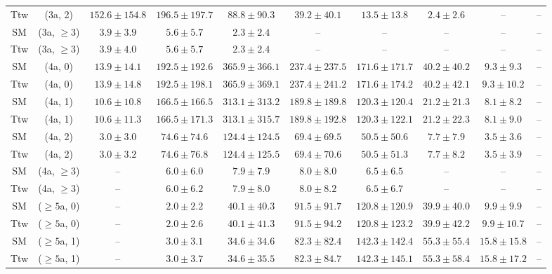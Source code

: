 \begin{table}[h!]
{\begin{tabular}{cccccccccc}
	Ttw & (3a, 2) & $152.6\pm 154.8$ & $196.5\pm 197.7$ & $88.8\pm 90.3$ & $39.2\pm 40.1$ & $13.5\pm 13.8$ & $2.4\pm 2.6$ & -- & -- \\[0.5ex] 
	SM & (3a, $\ge3$) & $3.9\pm 3.9$ & $5.6\pm 5.7$ & $2.3\pm 2.4$ & -- & -- & -- & -- & -- \\[0.5ex] 
	Ttw & (3a, $\ge3$) & $3.9\pm 4.0$ & $5.6\pm 5.7$ & $2.3\pm 2.4$ & -- & -- & -- & -- & -- \\[0.5ex] 
	SM & (4a, 0) & $13.9\pm 14.1$ & $192.5\pm 192.6$ & $365.9\pm 366.1$ & $237.4\pm 237.5$ & $171.6\pm 171.7$ & $40.2\pm 40.2$ & $9.3\pm 9.3$ & -- \\[0.5ex] 
	Ttw & (4a, 0) & $13.9\pm 14.8$ & $192.5\pm 198.1$ & $365.9\pm 369.1$ & $237.4\pm 241.2$ & $171.6\pm 174.2$ & $40.2\pm 42.1$ & $9.3\pm 10.2$ & -- \\[0.5ex] 
	SM & (4a, 1) & $10.6\pm 10.8$ & $166.5\pm 166.5$ & $313.1\pm 313.2$ & $189.8\pm 189.8$ & $120.3\pm 120.4$ & $21.2\pm 21.3$ & $8.1\pm 8.2$ & -- \\[0.5ex] 
	Ttw & (4a, 1) & $10.6\pm 11.3$ & $166.5\pm 171.3$ & $313.1\pm 315.7$ & $189.8\pm 192.8$ & $120.3\pm 122.1$ & $21.2\pm 22.3$ & $8.1\pm 9.0$ & -- \\[0.5ex] 
	SM & (4a, 2) & $3.0\pm 3.0$ & $74.6\pm 74.6$ & $124.4\pm 124.5$ & $69.4\pm 69.5$ & $50.5\pm 50.6$ & $7.7\pm 7.9$ & $3.5\pm 3.6$ & -- \\[0.5ex] 
	Ttw & (4a, 2) & $3.0\pm 3.2$ & $74.6\pm 76.8$ & $124.4\pm 125.5$ & $69.4\pm 70.6$ & $50.5\pm 51.3$ & $7.7\pm 8.2$ & $3.5\pm 3.9$ & -- \\[0.5ex] 
	SM & (4a, $\ge3$) & -- & $6.0\pm 6.0$ & $7.9\pm 7.9$ & $8.0\pm 8.0$ & $6.5\pm 6.5$ & -- & -- & -- \\[0.5ex] 
	Ttw & (4a, $\ge3$) & -- & $6.0\pm 6.2$ & $7.9\pm 8.0$ & $8.0\pm 8.2$ & $6.5\pm 6.7$ & -- & -- & -- \\[0.5ex] 
	SM & ($\ge5$a, 0) & -- & $2.0\pm 2.2$ & $40.1\pm 40.3$ & $91.5\pm 91.7$ & $120.8\pm 120.9$ & $39.9\pm 40.0$ & $9.9\pm 9.9$ & -- \\[0.5ex] 
	Ttw & ($\ge5$a, 0) & -- & $2.0\pm 2.6$ & $40.1\pm 41.3$ & $91.5\pm 94.2$ & $120.8\pm 123.2$ & $39.9\pm 42.2$ & $9.9\pm 10.7$ & -- \\[0.5ex] 
	SM & ($\ge5$a, 1) & -- & $3.0\pm 3.1$ & $34.6\pm 34.6$ & $82.3\pm 82.4$ & $142.3\pm 142.4$ & $55.3\pm 55.4$ & $15.8\pm 15.8$ & -- \\[0.5ex] 
	Ttw & ($\ge5$a, 1) & -- & $3.0\pm 3.7$ & $34.6\pm 35.5$ & $82.3\pm 84.7$ & $142.3\pm 145.1$ & $55.3\pm 58.4$ & $15.8\pm 17.2$ & -- \\[0.5ex] 

\end{tabular}}
\end{table}

